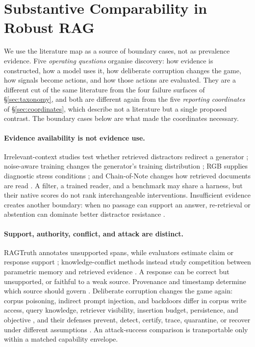 \section{Substantive Comparability in Robust RAG}
\label{sec:robust-rag-landscape}

We use the literature map as a source of boundary cases, not as prevalence
evidence. Five \emph{operating questions} organise discovery: how evidence is
constructed, how a model uses it, how deliberate corruption changes the game,
how signals become actions, and how those actions are evaluated. They are a
different cut of the same literature from the four failure surfaces of
\S\ref{sec:taxonomy}, and both are different again from the five
\emph{reporting coordinates} of \S\ref{sec:coordinates}, which describe not a
literature but a single proposed contrast. The boundary cases below are what
made the coordinates necessary.

\paragraph{Evidence availability is not evidence use.}
Irrelevant-context studies test whether retrieved distractors redirect a
generator \citep{irrelevantContext2023}; noise-aware training changes the
generator's training distribution \citep{raat2024}; RGB supplies diagnostic
stress conditions \citep{rgb2023}; and Chain-of-Note changes how retrieved
documents are read \citep{chainOfNote2023}. A filter, a trained reader, and a
benchmark may share a harness, but their native scores do not rank
interchangeable interventions. Insufficient evidence creates another
boundary: when no passage can support an answer, re-retrieval or abstention
can dominate better distractor resistance \citep{sufficientContext2024}.

\paragraph{Support, authority, conflict, and attack are distinct.}
RAGTruth annotates unsupported spans, while evaluators estimate claim or
response support \citep{ragTruth2024,ragas2024,ares2024}; knowledge-conflict
methods instead study competition between parametric memory and retrieved
evidence \citep{tugOfWar2024,faithfulRAG2025,astuteRAG2025}. A response can be
correct but unsupported, or faithful to a weak source. Provenance and timestamp
determine which source should govern \citep{kilt2021,freshllms2024,
realtimeQA2023}. Deliberate corruption changes the game again: corpus
poisoning, indirect prompt injection, and backdoors differ in corpus write
access, query knowledge, retriever visibility, insertion budget, persistence,
and objective \citep{poisonedRAG2024,aip2025,phantom2024}, and their defenses
prevent, detect, certify, trace, quarantine, or recover under different
assumptions \citep{certifiedRAG2024,rrag017,rrag128}. An attack-success
comparison is transportable only within a matched capability envelope.

